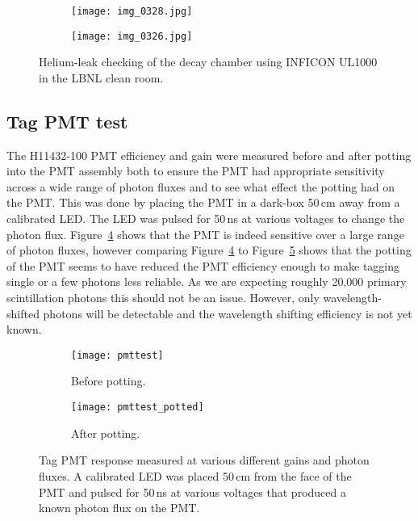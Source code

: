 \begin{figure}
        \centering
        \begin{subfigure}[b]{0.48\textwidth}
                \centering
                \texttt{[image: img\_0328.jpg]}
                \caption{}
                \label{fig:HeLeakCheckSetup}
        \end{subfigure}%
        \vspace{0.2cm}
        \begin{subfigure}[b]{0.45\textwidth}
                \centering
                \texttt{[image: img\_0326.jpg]}
                \caption{}
                \label{fig:HeLeakCheckResult}
        \end{subfigure}
        \caption{Helium-leak checking of the decay chamber using INFICON UL1000 in the LBNL clean room.}
\label{fig:HeLeakCheck}
\end{figure}

\subsection{Tag PMT test}
\label{sec:tagpmt}
The H11432-100 PMT efficiency and gain were measured before and after potting into the PMT assembly both to ensure the PMT had appropriate sensitivity across a wide range of photon fluxes and to see what effect the potting had on the PMT. This was done by placing the PMT in a dark-box 50\,cm away from a calibrated LED. The LED was pulsed for 50\,ns at various voltages to change the photon flux. Figure~\ref{fig:pmttest} shows that the PMT is indeed sensitive over a large range of photon fluxes, however comparing Figure~\ref{fig:pmttest} to Figure~\ref{fig:pmtafterpotting} shows that the potting of the PMT seems to have reduced the PMT efficiency enough to make tagging single or a few photons less reliable. As we are expecting roughly 20,000 primary scintillation photons this should not be an issue. However, only wavelength-shifted photons will be detectable and the wavelength shifting efficiency is not yet known.

\begin{figure}
    \begin{subfigure}{0.49\textwidth}
        \caption{Before potting.}
        \label{fig:pmttest}
        \texttt{[image: pmttest]}
    \end{subfigure}%
    \begin{subfigure}{0.49\textwidth}
        \caption{After potting.}
        \label{fig:pmtafterpotting}
        \texttt{[image: pmttest\_potted]}
    \end{subfigure}
    \caption{Tag PMT response measured at various different gains and photon fluxes. A calibrated LED was placed 50\,cm from the face of the PMT and pulsed for 50\,ns at various voltages that produced a known photon flux on the PMT.}
	\label{fig:calibratedled}
\end{figure}

